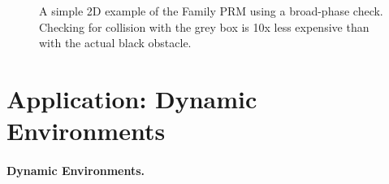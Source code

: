 \begin{figure}
{   }

   \caption{A simple 2D example of the Family PRM using
     a broad-phase check.
     Checking for collision with the grey box is 10x less expensive
     than with the actual black obstacle.}
   \label{fig:family:broad-phase-2d}
\end{figure}






\section{Application: Dynamic Environments}

\paragraph{Dynamic Environments.}
\label{subsec:family:dynamic-environments}

